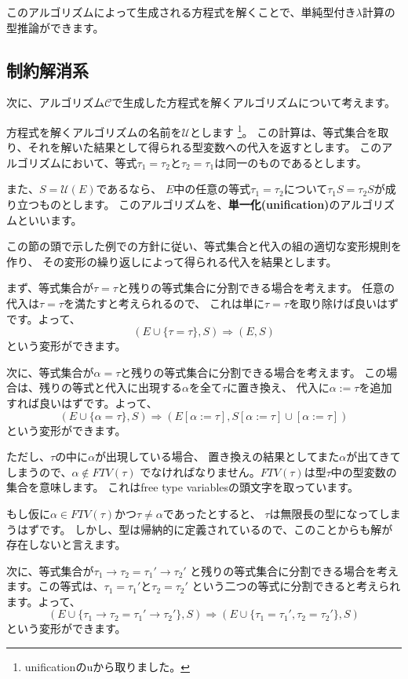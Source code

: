 このアルゴリズムによって生成される方程式を解くことで、単純型付き$\lambda$計算の型推論ができます。

\subsection{制約解消系}

次に、アルゴリズム$\mathcal C$で生成した方程式を解くアルゴリズムについて考えます。

方程式を解くアルゴリズムの名前を$\mathcal U$とします
\footnote{unificationのuから取りました。}。
この計算は、等式集合を取り、それを解いた結果として得られる型変数への代入を返すとします。
このアルゴリズムにおいて、等式$\tau_1 = \tau_2$と$\tau_2 = \tau_1$は同一のものであるとします。

また、$S = \mathcal{U}(E)$であるなら、
$E$中の任意の等式$\tau_1 = \tau_2$について$\tau_1 S = \tau_2 S$が成り立つものとします。
このアルゴリズムを、\textbf{単一化(unification)}のアルゴリズムといいます。

この節の頭で示した例での方針に従い、等式集合と代入の組の適切な変形規則を作り、
その変形の繰り返しによって得られる代入を結果とします。

まず、等式集合が$\tau = \tau$と残りの等式集合に分割できる場合を考えます。
任意の代入は$\tau = \tau$を満たすと考えられるので、
これは単に$\tau = \tau$を取り除けば良いはずです。よって、
\[
  (E \cup \{\tau = \tau\}, S) \Longrightarrow (E, S)
\]
という変形ができます。

次に、等式集合が$\alpha = \tau$と残りの等式集合に分割できる場合を考えます。
この場合は、残りの等式と代入に出現する$\alpha$を全て$\tau$に置き換え、
代入に$\alpha := \tau$を追加すれば良いはずです。よって、
\[
  (E \cup \{\alpha = \tau\}, S) \Longrightarrow
  (E[\alpha := \tau], S[\alpha := \tau] \cup [\alpha := \tau])
\]
という変形ができます。

ただし、$\tau$の中に$\alpha$が出現している場合、
置き換えの結果としてまた$\alpha$が出てきてしまうので、$\alpha \notin \mathit{FTV}(\tau)$
でなければなりません。$\mathit{FTV}(\tau)$は型$\tau$中の型変数の集合を意味します。
これはfree type variablesの頭文字を取っています。

もし仮に$\alpha \in \mathit{FTV}(\tau)$かつ$\tau \neq \alpha$であったとすると、
$\tau$は無限長の型になってしまうはずです。
しかし、型は帰納的に定義されているので、このことからも解が存在しないと言えます。

次に、等式集合が$\tau_1 \to \tau_2 = \tau_1' \to \tau_2'$
と残りの等式集合に分割できる場合を考えます。この等式は、$\tau_1 = \tau_1'$と$\tau_2 = \tau_2'$
という二つの等式に分割できると考えられます。よって、
\[
  (E \cup \{\tau_1 \to \tau_2 = \tau_1' \to \tau_2'\}, S) \Longrightarrow
  (E \cup \{\tau_1 = \tau_1', \tau_2 = \tau_2'\}, S)
\]
という変形ができます。

